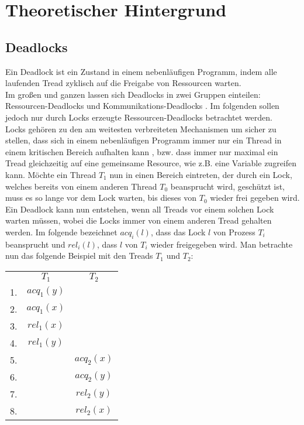 \chapter{Theoretischer Hintergrund}

\section{Deadlocks} \label{Kap::Theo:Deadlocks}

Ein Deadlock ist ein Zustand in einem nebenläufigen Programm, indem alle laufenden Tread zyklisch auf die Freigabe von Ressourcen warten.\\
Im großen und ganzen lassen sich Deadlocks in zwei Gruppen einteilen: Ressourcen-Deadlocks und Kommunikations-Deadlocks \cite{zhou}.
Im folgenden sollen jedoch nur durch Locks erzeugte Ressourcen-Deadlocks betrachtet werden.\\
Locks gehören zu den am weitesten verbreiteten Mechanismen um sicher zu stellen, dass sich in einem nebenläufigen Programm immer nur ein Thread in einem kritischen Bereich aufhalten kann \cite*{zhou}, bzw.
dass immer nur maximal ein Tread gleichzeitig auf eine gemeinsame Resource, wie 
z.B. eine Variable zugreifen kann. Möchte ein Thread $T_1$ nun in einen Bereich eintreten, der durch ein Lock, welches bereits von einem anderen Thread $T_0$ beansprucht wird, geschützt ist, muss es so lange vor dem Lock warten, bis dieses von $T_0$ wieder frei gegeben wird.\\
Ein Deadlock kann nun entstehen, wenn all Treads vor einem solchen Lock warten müssen, wobei die Locks immer von einem anderen Tread gehalten werden. Im folgende bezeichnet $acq_i(l)$, dass das Lock $l$ von Prozess $T_i$ beansprucht und $rel_i(l)$, dass $l$ von $T_i$ wieder freigegeben wird. Man betrachte nun das folgende Beispiel \cite{sulzmann} mit den Treads $T_1$ und $T_2$:
\begin{table}[H]
    \centering
    \begin{tabular}{ccc}
       & $T_1$        & $T_2$          \\
    1. & $acq_{1}(y)$ &                \\
    2. & $acq_{1}(x)$ &                \\
    3. & $rel_{1}(x)$ &                \\
    4. & $rel_{1}(y)$ &                \\
    5. &              & $acq_{2}(x)$ \\
    6. &              & $acq_{2}(y)$ \\
    7. &              & $rel_{2}(y)$ \\
    8. &              & $rel_{2}(x)$
    \end{tabular}
\end{table}
